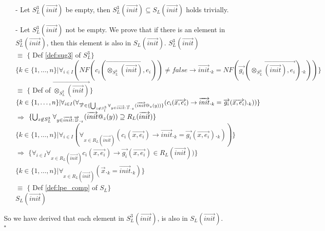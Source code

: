 \index{}\documentclass[a4paper,10pt]{article}
\theoremstyle{plain}
\theoremstyle{definition}
\newcommand{\ovr}{\overrightarrow}
\newcommand{\sq}{$\square$}
\newcommand{\tab}{\hspace*{5.mm} \= \hspace*{5.mm} \= \hspace*{5.mm} \= \hspace*{5.mm} \= \hspace*{5.mm} \= \hspace*{5.mm}  \= \hspace*{5.mm}  \= \hspace*{5.mm}  \= \hspace*{5.mm} \= \hspace*{5.mm} \= \hspace*{5.mm}  \= \hspace*{5.mm}  \= \hspace*{5.mm}\kill}
\begin{document}
\begin{itemize}
\newcommand{\tmp}{\vspace{8pt}}

\item[-] Let $S_L^3(\ovr{init})$ be empty, then $S_L^3(\ovr{init}) \subseteq S_L(\ovr{init})$ holds trivially.
\item[-] Let $S_L^3(\ovr{init})$ not be empty. We prove that if there is an element in $S_L^3(\ovr{init})$, then this element is also in $S_L(\ovr{init})$. \newline \newline
 \tmp $ S_L^3(\ovr{init})$ \\ 
 \tmp $ \equiv $ \hspace{20pt} $\lbrace$ Def \ref{def:sug3} of $S_L^3 \rbrace$ \\ 
 \tmp $ \lbrace k \in \lbrace 1, \ldots, n \rbrace \vert \forall_{i \in I}(NF(c_i(\ovr{\otimes_{S_L^3}(\ovr{init}), e_i})) \neq false \rightarrow \ovr{init}._k = NF(\ovr{g_i}(\ovr{\otimes_{S_L^3}(\ovr{init}), e_i})._k) ) \rbrace$ \\
\tmp $ \equiv $ \hspace{20pt} $\lbrace$ Def of $\ovr{\otimes_{S_L^3}(\ovr{init})}\rbrace$ \\ 
\tmp $ \lbrace k \in \lbrace 1, \ldots, n \rbrace \vert \forall_{i \in I}(\forall_{\ovr{x} \in \lbrace \bigcup_{z \not\in S_l^3 } \forall_{y \in \ovr{init}:\ovr{\Bbb{D}}._{z}} (\ovr{init}@_{z}(y) ) \rbrace}(c_i(\ovr{x, e_i}) \rightarrow \ovr{init}._k = \ovr{g_i}(\ovr{x, e_i})._k )) \rbrace$\\
\tmp $ \Rightarrow$ \hspace{20pt} $\lbrace \bigcup_{z \not\in S_L^3 } \forall_{y \in \ovr{init}:\ovr{\Bbb{D}}._{z}} (\ovr{init}@_{z}(y) ) \supseteq R_L(\ovr{init}) \rbrace$  \\
\tmp $ \lbrace k \in \lbrace 1, \ldots, n \rbrace \vert \forall_{i \in I}(\forall_{x \in R_L(\ovr{init})}( c_i(\ovr{x, e_i})  \rightarrow \ovr{init}._k = \ovr{g_i}(\ovr{x, e_i})._k )) \rbrace$\\
\tmp $ \Rightarrow$ \hspace{20pt} $\lbrace \forall_{i \in I} \forall_{x \in R_L(\ovr{init})} c_i(\ovr{x,e_i}) \rightarrow \ovr{g_i}(\ovr{x, e_i}) \in R_L(\ovr{init}) ) \rbrace$\\
$ \lbrace k \in \lbrace 1, \ldots, n \rbrace \vert \forall_{x \in R_L(\ovr{init})}(\ovr{x}._k = \ovr{init}._k) \rbrace$\\
\tmp $ \equiv$ \hspace{20pt} $\lbrace$ Def \ref{def:lpe_comp} of $S_L\rbrace$\\
\tmp $S_L(\ovr{init})$

\end{itemize}
So we have derived that each element in $S_L^3(\ovr{init})$, is also in $S_L(\ovr{init})$.
\\ \sq
\end{document}

